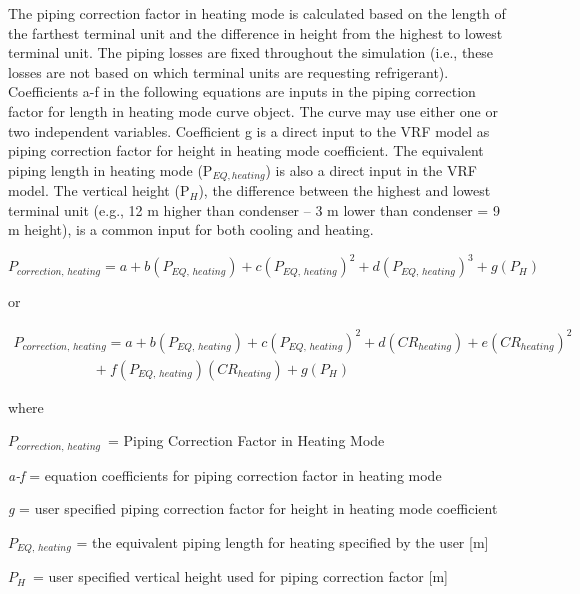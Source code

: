 The piping correction factor in heating mode is calculated based on the length of the farthest terminal unit and the difference in height from the highest to lowest terminal unit. The piping losses are fixed throughout the simulation (i.e., these losses are not based on which terminal units are requesting refrigerant). Coefficients a-f in the following equations are inputs in the piping correction factor for length in heating mode curve object. The curve may use either one or two independent variables. Coefficient g is a direct input to the VRF model as piping correction factor for height in heating mode coefficient. The equivalent piping length in heating mode (P\(_{EQ,heating}\)) is also a direct input in the VRF model. The vertical height (P\(_H\)), the difference between the highest and lowest terminal unit (e.g., 12 m higher than condenser – 3 m lower than condenser = 9 m height), is a common input for both cooling and heating.

\begin{equation}
  P_{correction,\,heating} = a + b \left( P_{EQ,\,heating} \right) + c \left( P_{EQ,\,heating} \right)^2 + d \left( P_{EQ,\,heating} \right)^3 + g \left( P_H \right)
\end{equation}

or

\begin{equation}
  \begin{array}{l}
  {P_{correction,\,heating}} = a + b \left( P_{EQ,\,heating} \right) + c \left( P_{EQ,\,heating} \right)^2 + d \left( CR_{heating} \right) + e \left( CR_{heating} \right)^2 \\
  \,\,\,\,\,\,\,\,\,\,\,\,\,\,\,\,\,\,\,\,\,\,\,\,\,\,\,\,\,\,\,\,\,\, + f \left( P_{EQ,\,heating} \right) \left( CR_{heating} \right) + g \left( P_H \right)
  \end{array}
\end{equation}

where

\(P_{correction,\,heating}\) = Piping Correction Factor in Heating Mode

\emph{a-f} = equation coefficients for piping correction factor in heating mode

\emph{g} = user specified piping correction factor for height in heating mode coefficient

\(P_{EQ,\,heating}\) = the equivalent piping length for heating specified by the user [m]

\(P_H\) = user specified vertical height used for piping correction factor [m]

